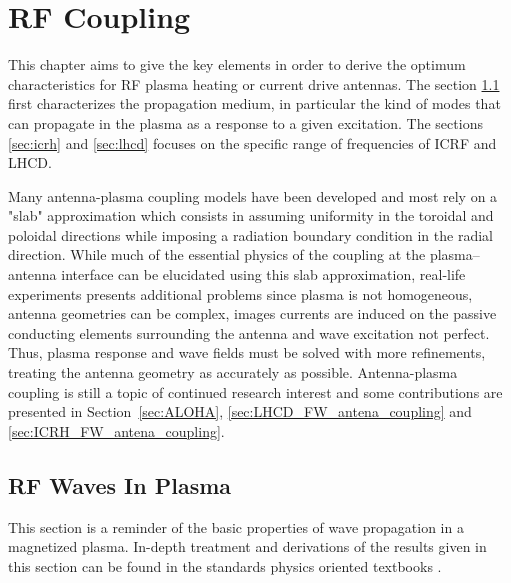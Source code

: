 \chapter{RF Coupling}
\label{chap:rf_coupling}
This chapter aims to give the key elements in order to derive the optimum characteristics for RF plasma heating or current drive antennas. The section \ref{sec:waves-in-plasma} first characterizes the propagation medium, in particular the kind of modes that can propagate in the plasma as a response to a given excitation. The sections \ref{sec:icrh} and \ref{sec:lhcd} focuses on the specific range of frequencies of ICRF and LHCD. 

Many antenna-plasma coupling models have been developed and most rely on a "slab" approximation which consists in assuming uniformity in the toroidal and poloidal directions while imposing a radiation boundary condition in the radial direction. While much of the essential physics of the coupling at the plasma–antenna interface can be elucidated using this slab approximation, real-life experiments presents additional problems since plasma is not homogeneous, antenna geometries can be complex, images currents are induced on the passive conducting elements surrounding the antenna and wave excitation not perfect. Thus, plasma response and wave fields must be solved with more refinements, treating the antenna geometry as accurately as possible. Antenna-plasma coupling is still a topic of continued research interest and some contributions are presented in Section~\ref{sec:ALOHA}, \ref{sec:LHCD_FW_antena_coupling} and \ref{sec:ICRH_FW_antena_coupling}.


\section{RF Waves In Plasma}\label{sec:waves-in-plasma}
This section is a reminder of the basic properties of wave propagation in a magnetized plasma. In-depth treatment and derivations of the results given in this section can be found in the standards physics oriented textbooks . 

